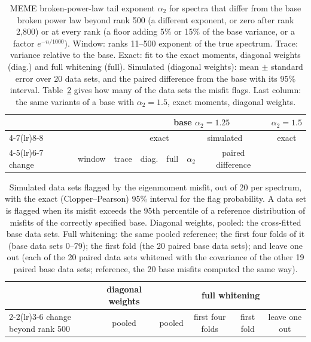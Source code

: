 \begin{table}[t]
\centering\footnotesize
\caption{MEME broken-power-law tail exponent $\alpha_2$ for spectra that differ from the base broken power law beyond rank 500 (a different exponent, or zero after rank 2,800) or at every rank (a floor adding 5\% or 15\% of the base variance, or a factor $e^{-n/1000}$). Window: ranks 11--500 exponent of the true spectrum. Trace: variance relative to the base. Exact: fit to the exact moments, diagonal weights (diag.) and full whitening (full). Simulated (diagonal weights): mean $\pm$ standard error over 20 data sets, and the paired difference from the base with its 95\% interval. Table~\ref{tab:flag} gives how many of the data sets the misfit flags. Last column: the same variants of a base with $\alpha_2 = 1.5$, exact moments, diagonal weights.}\label{tab:meme}
\setlength{\tabcolsep}{3pt}
\begin{tabular}{lccccccc}
\toprule
& & & \multicolumn{4}{c}{base $\alpha_2 = 1.25$} & $\alpha_2 = 1.5$ \\
\cmidrule(lr){4-7}\cmidrule(lr){8-8}
& & & \multicolumn{2}{c}{exact} & \multicolumn{2}{c}{simulated} & exact \\
\cmidrule(lr){4-5}\cmidrule(lr){6-7}
change & window & trace & diag. & full & $\alpha_2$ & paired difference & \\
\midrule

\end{tabular}
\end{table}

\begin{table}[t]
\centering\footnotesize
\caption{Simulated data sets flagged by the eigenmoment misfit, out of 20 per spectrum, with the exact (Clopper--Pearson) 95\% interval for the flag probability. A data set is flagged when its misfit exceeds the 95th percentile of a reference distribution of misfits of the correctly specified base. Diagonal weights, pooled: the \MemeNB{} cross-fitted base data sets. Full whitening: the same pooled reference; the first four folds of it (base data sets 0--79); the first fold (the 20 paired base data sets); and leave one out (each of the 20 paired data sets whitened with the covariance of the other 19 paired base data sets; reference, the 20 base misfits computed the same way).}\label{tab:flag}
\setlength{\tabcolsep}{3pt}
\begin{tabular}{lccccc}
\toprule
& diagonal weights & \multicolumn{4}{c}{full whitening} \\
\cmidrule(lr){2-2}\cmidrule(lr){3-6}
change beyond rank 500 & pooled & pooled & first four folds & first fold & leave one out \\
\midrule

\end{tabular}
\end{table}

